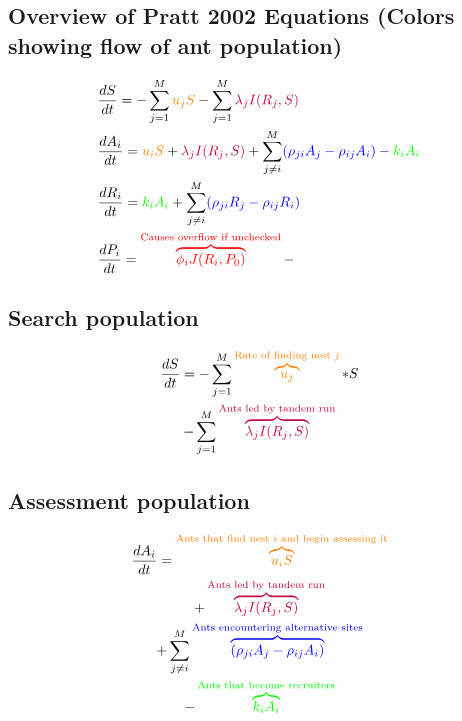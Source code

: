 \documentclass[letterpaper]{article}
\makeatletter
\def\mcolor#1#{\@mcolor{#1}}
\def\@mcolor#1#2#3{%
  \protect\leavevmode
  \begingroup
    \color#1{#2}#3%
  \endgroup
}
\newcommand{\annotate}[3]{
\mcolor{#1}{\overbrace{#3}^\text{#2}}
}
\makeatother
\begin{document}
  \subsection{Overview of Pratt 2002 Equations (Colors showing flow of ant population)}
      \Large
      \begin{equation}
      \begin{aligned}
          & \frac{dS}{dt} = - \sum_{j=1}^M \mcolor{orange}{u_jS} - \sum_{j=1}^M \mcolor{purple}{\lambda_jI(R_j, S)} \\
          & \frac{dA_i}{dt} = \mcolor{orange}{u_iS} + \mcolor{purple}{\lambda_jI(R_j, S)} + \sum_{j \neq i}^M \mcolor{blue}{(\rho_{ji}A_j - \rho_{ij}A_i)} - \mcolor{green}{k_iA_i} \\
          & \frac{dR_i}{dt} = \mcolor{green}{k_iA_i} + \sum_{j \neq i}^M \mcolor{blue}{(\rho_{ji}R_j - \rho_{ij}R_i)} \\
          & \frac{dP_i}{dt} = \annotate{red}{Causes overflow if unchecked}{\phi_iJ(R_i, P_0)} - \annotate{white}{Fix: Subtract moved ants}{\phi_{dest}J(R_{dest},P_0)}
      \end{aligned}
      \end{equation}
  \subsection{Search population}
      \Large
      \begin{multline}
      \frac{dS}{dt} = - \sum_{j=1}^M \annotate{orange}{Rate of finding nest $j$}{u_j}*S \\  
      - \sum_{j=1}^M \annotate{purple}{Ants led by tandem run}{\lambda_jI(R_j, S)} 
      \end{multline}
  \subsection{Assessment population}
      \Large
      \begin{multline}
      \frac{dA_i}{dt} = \annotate{orange}{Ants that find nest $i$ and begin assessing it}{u_iS} \\ 
      + \annotate{purple}{Ants led by tandem run}{\lambda_jI(R_j, S)} \\
      + \sum_{j \neq i}^M \annotate{blue}{Ants encountering alternative sites}{(\rho_{ji}A_j - \rho_{ij}A_i)} \\ 
      - \annotate{green}{Ants that become recruiters}{k_iA_i} \\
      \end{multline}
\end{document}
